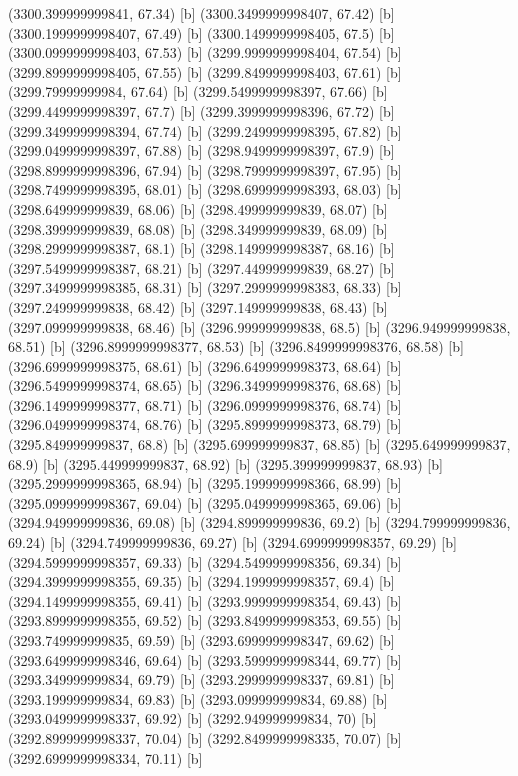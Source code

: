 {{{(3300.399999999841, 67.34) [b] 
(3300.3499999998407, 67.42) [b] 
(3300.1999999998407, 67.49) [b] 
(3300.1499999998405, 67.5) [b] 
(3300.0999999998403, 67.53) [b] 
(3299.9999999998404, 67.54) [b] 
(3299.8999999998405, 67.55) [b] 
(3299.8499999998403, 67.61) [b] 
(3299.79999999984, 67.64) [b] 
(3299.5499999998397, 67.66) [b] 
(3299.4499999998397, 67.7) [b] 
(3299.3999999998396, 67.72) [b] 
(3299.3499999998394, 67.74) [b] 
(3299.2499999998395, 67.82) [b] 
(3299.0499999998397, 67.88) [b] 
(3298.9499999998397, 67.9) [b] 
(3298.8999999998396, 67.94) [b] 
(3298.7999999998397, 67.95) [b] 
(3298.7499999998395, 68.01) [b] 
(3298.6999999998393, 68.03) [b] 
(3298.649999999839, 68.06) [b] 
(3298.499999999839, 68.07) [b] 
(3298.399999999839, 68.08) [b] 
(3298.349999999839, 68.09) [b] 
(3298.2999999998387, 68.1) [b] 
(3298.1499999998387, 68.16) [b] 
(3297.5499999998387, 68.21) [b] 
(3297.449999999839, 68.27) [b] 
(3297.3499999998385, 68.31) [b] 
(3297.2999999998383, 68.33) [b] 
(3297.249999999838, 68.42) [b] 
(3297.149999999838, 68.43) [b] 
(3297.099999999838, 68.46) [b] 
(3296.999999999838, 68.5) [b] 
(3296.949999999838, 68.51) [b] 
(3296.8999999998377, 68.53) [b] 
(3296.8499999998376, 68.58) [b] 
(3296.6999999998375, 68.61) [b] 
(3296.6499999998373, 68.64) [b] 
(3296.5499999998374, 68.65) [b] 
(3296.3499999998376, 68.68) [b] 
(3296.1499999998377, 68.71) [b] 
(3296.0999999998376, 68.74) [b] 
(3296.0499999998374, 68.76) [b] 
(3295.8999999998373, 68.79) [b] 
(3295.849999999837, 68.8) [b] 
(3295.699999999837, 68.85) [b] 
(3295.649999999837, 68.9) [b] 
(3295.449999999837, 68.92) [b] 
(3295.399999999837, 68.93) [b] 
(3295.2999999998365, 68.94) [b] 
(3295.1999999998366, 68.99) [b] 
(3295.0999999998367, 69.04) [b] 
(3295.0499999998365, 69.06) [b] 
(3294.949999999836, 69.08) [b] 
(3294.899999999836, 69.2) [b] 
(3294.799999999836, 69.24) [b] 
(3294.749999999836, 69.27) [b] 
(3294.6999999998357, 69.29) [b] 
(3294.5999999998357, 69.33) [b] 
(3294.5499999998356, 69.34) [b] 
(3294.3999999998355, 69.35) [b] 
(3294.1999999998357, 69.4) [b] 
(3294.1499999998355, 69.41) [b] 
(3293.9999999998354, 69.43) [b] 
(3293.8999999998355, 69.52) [b] 
(3293.8499999998353, 69.55) [b] 
(3293.749999999835, 69.59) [b] 
(3293.6999999998347, 69.62) [b] 
(3293.6499999998346, 69.64) [b] 
(3293.5999999998344, 69.77) [b] 
(3293.349999999834, 69.79) [b] 
(3293.2999999998337, 69.81) [b] 
(3293.199999999834, 69.83) [b] 
(3293.099999999834, 69.88) [b] 
(3293.0499999998337, 69.92) [b] 
(3292.949999999834, 70) [b] 
(3292.8999999998337, 70.04) [b] 
(3292.8499999998335, 70.07) [b] 
(3292.6999999998334, 70.11) [b] 
}}}
